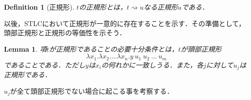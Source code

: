 \documentclass[a4paper,10pt,platex]{jsarticle}
\newtheorem{definition}{Definition}
\newtheorem{lemma}{Lemma}
\begin{document}
\begin{definition}[正規形]
    $t$の正規形とは，$t\rightsquigarrow u$なる正規形$u$である．
\end{definition}
以後，STLCにおいて正規形が一意的に存在することを示す．その準備として，頭部正規形と正規形の等価性を示そう．
\begin{lemma}
項$t$が正規形であることの必要十分条件とは，$t$が\emph{頭部正規形}\begin{equation}
    \lambda x_{1}.\lambda x_{2}.\ldots \lambda x_{n}. y\ u_{1}\ u_{2}\ \ldots\ u_{m}
\end{equation}であることである．ただし$y$は$x_{i}$の何れかに一致しうる．また，各$j$に対して$u_{j}$は正規形である．
\end{lemma}
\dbend $u_{j}$が全て頭部正規形でない場合に起こる事を考察する．
\end{document}
